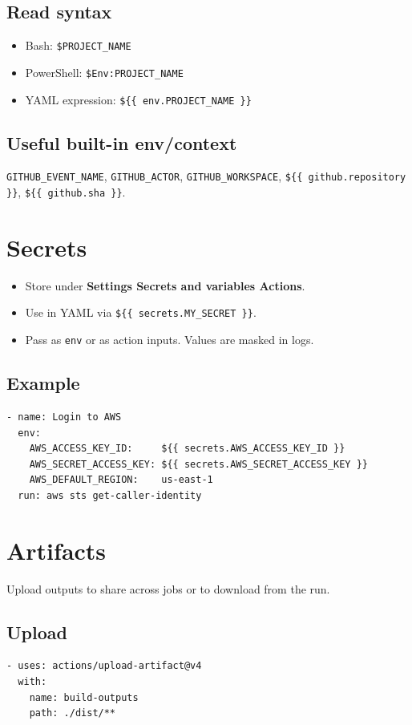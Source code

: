 \documentclass[11pt]{article}
\begin{document}
\subsection{Read syntax}
\begin{itemize}
  \item Bash: \texttt{\$PROJECT\_NAME}
  \item PowerShell: \texttt{\$Env:PROJECT\_NAME}
  \item YAML expression: \texttt{\$\{\{ env.PROJECT\_NAME \}\}}
\end{itemize}

\subsection{Useful built-in env/context}
{\raggedright \texttt{GITHUB\_EVENT\_NAME}, \texttt{GITHUB\_ACTOR}, \texttt{GITHUB\_WORKSPACE}, \texttt{\$\{\{ github.repository \}\}}, \texttt{\$\{\{ github.sha \}\}}.\par}
\clearpage

\section{Secrets}
\begin{itemize}
  \item Store under \textbf{Settings \textrightarrow{} Secrets and variables \textrightarrow{} Actions}.
  \item Use in YAML via \texttt{\$\{\{ secrets.MY\_SECRET \}\}}.
  \item Pass as \texttt{env} or as action inputs. Values are masked in logs.
\end{itemize}

\subsection{Example}
\begin{verbatim}
- name: Login to AWS
  env:
    AWS_ACCESS_KEY_ID:     ${{ secrets.AWS_ACCESS_KEY_ID }}
    AWS_SECRET_ACCESS_KEY: ${{ secrets.AWS_SECRET_ACCESS_KEY }}
    AWS_DEFAULT_REGION:    us-east-1
  run: aws sts get-caller-identity
\end{verbatim}

\section{Artifacts}
Upload outputs to share across jobs or to download from the run.
\subsection{Upload}
\begin{verbatim}
- uses: actions/upload-artifact@v4
  with:
    name: build-outputs
    path: ./dist/**
\end{verbatim}
\end{document}
